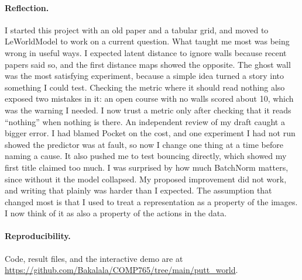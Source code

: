 \documentclass[10pt,twocolumn]{article}
\begin{document}
\paragraph{Reflection.} I started this project with an old paper and a tabular grid, and moved to LeWorldModel to work on a current question. What taught me most was being wrong in useful ways. I expected latent distance to ignore walls because recent papers said so, and the first distance maps showed the opposite. The ghost wall was the most satisfying experiment, because a simple idea turned a story into something I could test. Checking the metric where it should read nothing also exposed two mistakes in it: an open course with no walls scored about 10, which was the warning I needed. I now trust a metric only after checking that it reads ``nothing'' when nothing is there. An independent review of my draft caught a bigger error. I had blamed Pocket on the cost, and one experiment I had not run showed the predictor was at fault, so now I change one thing at a time before naming a cause. It also pushed me to test bouncing directly, which showed my first title claimed too much. I was surprised by how much BatchNorm matters, since without it the model collapsed. My proposed improvement did not work, and writing that plainly was harder than I expected. The assumption that changed most is that I used to treat a representation as a property of the images. I now think of it as also a property of the actions in the data.

\paragraph{Reproducibility.} Code, result files, and the interactive demo are at \url{https://github.com/Bakalala/COMP765/tree/main/putt_world}.

\small


\end{document}
